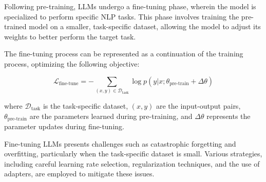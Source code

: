             Following pre-training, LLMs undergo a fine-tuning phase, wherein the model is specialized to perform specific NLP tasks. This phase involves training the pre-trained model on a smaller, task-specific dataset, allowing the model to adjust its weights to better perform the target task.
            
            The fine-tuning process can be represented as a continuation of the training process, optimizing the following objective:
            
            \begin{equation}
            \mathcal{L}_{\text{fine-tune}} = -\sum_{(x,y) \in \mathcal{D}_{\text{task}}} \log p(y | x; \theta_{\text{pre-train}} + \Delta\theta)
            \end{equation}
            
            where $\mathcal{D}_{\text{task}}$ is the task-specific dataset, $(x,y)$ are the input-output pairs, $\theta_{\text{pre-train}}$ are the parameters learned during pre-training, and $\Delta\theta$ represents the parameter updates during fine-tuning.
            \vspace*{0.2cm}

            Fine-tuning LLMs presents challenges such as catastrophic forgetting and overfitting, particularly when the task-specific dataset is small. Various strategies, including careful learning rate selection, regularization techniques, and the use of adapters, are employed to mitigate these issues.